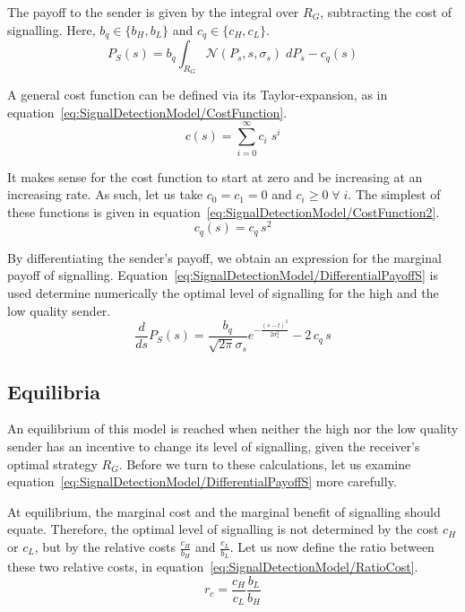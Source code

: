 \documentclass[a4paper,12pt]{article}
\numberwithin{equation}{section}
\begin{document}
The payoff to the sender is given by the integral over $R_{G}$, subtracting the cost of signalling. Here, $b_{q} \in \{b_{H}, b_{L}\}$ and $c_{q} \in \{c_{H}, c_{L}\}$.
\begin{equation}
\label{eq:SignalDetectionModel/PayoffS}
P_{S}(s) = b_{q} \displaystyle \int_{R_{G}} \mathcal{N}(P_{s}, s, \sigma_{s}) \; dP_{s}-c_{q}(s)
\end{equation}

A general cost function can be defined via its Taylor-expansion, as in equation~\ref{eq:SignalDetectionModel/CostFunction}.
\begin{equation}
\label{eq:SignalDetectionModel/CostFunction}
c(s)=\sum_{i=0}^{\infty} c_{i} \; s^{i}
\end{equation}

It makes sense for the cost function to start at zero and be increasing at an increasing rate. As such, let us take $c_{0}=c_{1}=0$ and $c_{i} \geq 0 \; \forall \; i$. The simplest of these functions is given in equation~\ref{eq:SignalDetectionModel/CostFunction2}.
\begin{equation}
\label{eq:SignalDetectionModel/CostFunction2}
c_{q}(s)=c_{q} \, s^{2}
\end{equation}

By differentiating the sender's payoff, we obtain an expression for the marginal payoff of signalling. Equation~\ref{eq:SignalDetectionModel/DifferentialPayoffS} is used determine numerically the optimal level of signalling for the high and the low quality sender.
\begin{equation}
\label{eq:SignalDetectionModel/DifferentialPayoffS}
\frac{d}{ds} P_{S}(s) = \frac{b_{q}}{\sqrt{2 \pi} \sigma_{s}} e^{-\frac{(s-t)^2}{2 \sigma_{s}^2}} - 2 \, c_{q} \, s
\end{equation}


\subsection{Equilibria}
\label{sec:SignalDetectionModel/Equilibria}

An equilibrium of this model is reached when neither the high nor the low quality sender has an incentive to change its level of signalling, given the receiver's optimal strategy $R_{G}$. Before we turn to these calculations, let us examine equation~\ref{eq:SignalDetectionModel/DifferentialPayoffS} more carefully.

At equilibrium, the marginal cost and the marginal benefit of signalling should equate. Therefore, the optimal level of signalling is not determined by the cost $c_{H}$ or $c_{L}$, but by the relative costs $\frac{c_{H}}{b_{H}}$ and $\frac{c_{L}}{b_{L}}$. Let us now define the ratio between these two relative costs, in equation~\ref{eq:SignalDetectionModel/RatioCost}.
\begin{equation}
\label{eq:SignalDetectionModel/RatioCost}
r_{c} = \frac{c_{H}}{c_{L}} \frac{b_{L}}{b_{H}}
\end{equation}
\end{document}

